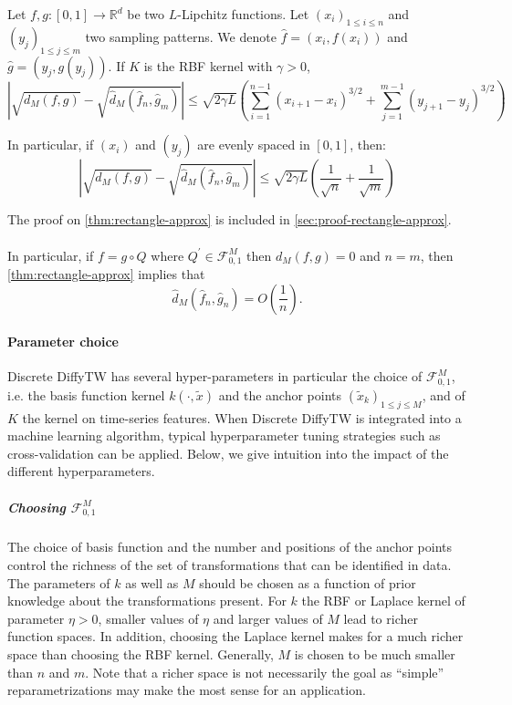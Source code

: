 \begin{theorem}\label{thm:rectangle-approx}
Let $f,g:[0,1] \to \mathbb R^d$ be two $L$-Lipchitz functions. Let $(x_i)_{1\leq i \leq n}$ and $(y_j)_{1\leq j\leq m}$ two sampling patterns. We denote $\hat f = (x_i, f(x_i))$ and $\hat g = (y_j, g(y_j))$.
If $K$ is the RBF kernel with $\gamma > 0$,
\begin{equation}
    \left\vert \sqrt{d_M(f, g)} - \sqrt{\hat d_M(\hat f_n, \hat g_m)}\right\vert \leq \sqrt{2\gamma L}\left(\sum_{i=1}^{n-1} (x_{i+1} - x_i)^{3/2} + \sum_{j=1}^{m-1} (y_{j+1} - y_j)^{3/2}\right)
\end{equation}

In particular, if $(x_i)$ and $(y_j)$ are evenly spaced in $[0,1]$, then:
\begin{equation}
    \left\vert \sqrt{d_M(f, g)} - \sqrt{\hat d_M(\hat f_n, \hat g_m)}\right\vert \leq \sqrt{2\gamma L}\left(\frac{1}{\sqrt{n}} + \frac{1}{\sqrt{m}}\right)
\end{equation}
\end{theorem}

The proof on \cref{thm:rectangle-approx} is included in \cref{sec:proof-rectangle-approx}.

\paragraph{}

In particular, if $f = g \circ Q$ where $Q^\prime \in\mathcal F_{0, 1}^M$ then $d_M(f, g)=0$ and $n=m$, then \cref{thm:rectangle-approx} implies that
\begin{equation}
\hat d_M(\hat f_n, \hat g_n) = O\left(\frac{1}{n}\right).
\end{equation}

\paragraph{Parameter choice}
Discrete DiffyTW has several hyper-parameters in particular the choice of $\mathcal F_{0,1}^M$, i.e. the basis function kernel $k(\cdot, \tilde x)$ and the anchor points $(\tilde x_k)_{1\leq j\leq M}$, and of $K$ the kernel on time-series features. When Discrete DiffyTW is integrated into a machine learning algorithm, typical hyperparameter tuning strategies such as cross-validation can be applied. Below, we give intuition into the impact of the different hyperparameters.

\subparagraph{Choosing $\mathcal F_{0,1}^M$} The choice of basis function and the number and positions of the anchor points control the richness of the set of transformations that can be identified in data. The parameters of $k$ as well as $M$ should be chosen as a function of prior knowledge about the transformations present. For $k$ the RBF or Laplace kernel of parameter $\eta>0$, smaller values of $\eta$ and larger values of $M$ lead to richer function spaces. In addition, choosing the Laplace kernel makes for a much richer space than choosing the RBF kernel\cite{ref}. Generally, $M$ is chosen to be much smaller than $n$ and $m$. Note that a richer space is not necessarily the goal as ``simple'' reparametrizations may make the most sense for an application.


